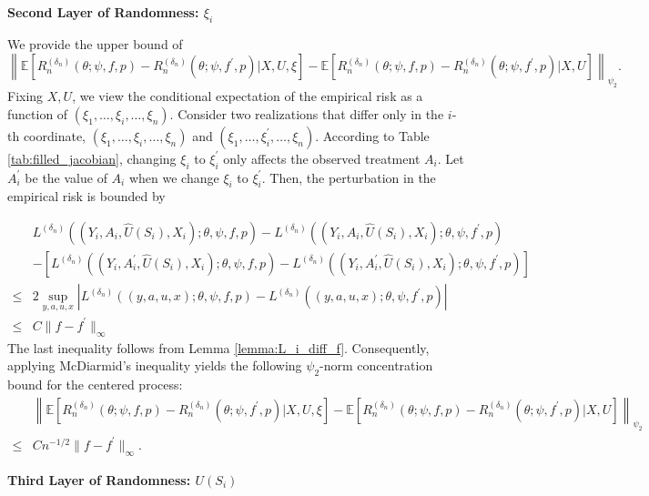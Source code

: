 \documentclass[12pt]{article}
\newcommand{\E}{\mathbb{E}}
\begin{document}
\noindent\textbf{Second Layer of Randomness: $\xi_i$}

\noindent We provide the upper bound of
$$\left\|\E\left[R_n^{(\delta_n)}(\theta;\psi,f,p)-R_n^{({\delta_n})}(\theta;\psi,f^\prime,p)|X,U,\xi\right]-\E\left[R_n^{(\delta_n)}(\theta;\psi,f,p)-R_n^{({\delta_n})}(\theta;\psi,f^\prime,p)|X,U\right]\right\|_{\psi_2}.$$
Fixing $X,U$, we view the conditional expectation of the empirical risk as a function of $(\xi_1, \ldots,\xi_i,\ldots, \xi_n)$. Consider two realizations that differ only in the $i$-th coordinate, $(\xi_1, \ldots,\xi_i,\ldots, \xi_n)$ and $(\xi_1, \ldots,\xi_i^\prime,\ldots, \xi_n)$. According to Table \ref{tab:filled_jacobian}, changing $\xi_i$ to $\xi_i^\prime$ only affects the observed treatment $A_i$. Let $A_i^\prime$ be the value of $A_i$ when we change $\xi_i$ to $\xi_i^\prime$. Then, the perturbation in the empirical risk is bounded by

\begin{align*}
&L^{(\delta_n)}((Y_i,A_i,\widehat U(S_i),X_i);\theta,\psi,f,p) - L^{(\delta_n)}((Y_i,A_i,\widehat U(S_i),X_i);\theta,\psi,f^\prime,p)\\
        & -\left[L^{(\delta_n)}((Y_i,A_i^\prime,\widehat U(S_i),X_i);\theta,\psi,f,p) - L^{(\delta_n)}((Y_i,A_i^\prime,\widehat U(S_i),X_i);\theta,\psi,f^\prime,p)\right]\\
        \leq  & 2\sup_{y,a,u,x}\left|L^{(\delta_n)}((y,a,u,x);\theta,\psi,f,p) - L^{(\delta_n)}((y,a,u,x);\theta,\psi,f^\prime,p)\right|\\
        \leq & C\|f-f^\prime\|_\infty
\end{align*}
The last inequality follows from Lemma \ref{lemma:L_i_diff_f}. Consequently, applying McDiarmid's inequality yields the following $\psi_2$-norm concentration bound for the centered process:
\begin{align*}
    &\left\|\E\left[R_n^{(\delta_n)}(\theta;\psi,f,p)-R_n^{({\delta_n})}(\theta;\psi,f^\prime,p)|X,U,\xi\right]-\E\left[R_n^{(\delta_n)}(\theta;\psi,f,p)-R_n^{({\delta_n})}(\theta;\psi,f^\prime,p)|X,U\right]\right\|_{\psi_2}\\
    \leq & C n^{-1/2}\|f - f^\prime\|_{\infty}.
\end{align*}

\noindent\textbf{Third Layer of Randomness: $U(S_i)$}
\end{document}
